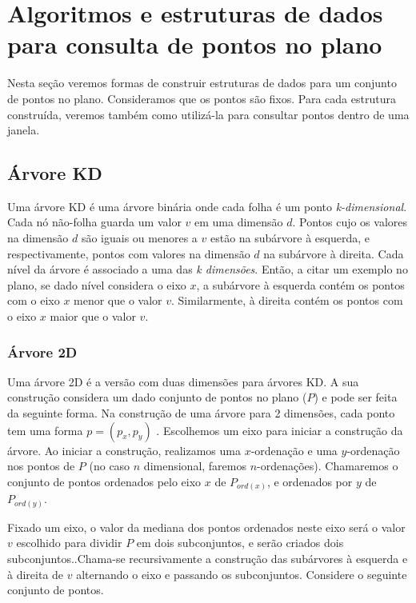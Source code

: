 \chapter{Algoritmos e estruturas de dados para consulta de pontos no plano}\label{cap:desenvolvimento}
Nesta seção veremos formas de construir estruturas de dados para um conjunto de pontos no plano. 
Consideramos que os pontos são fixos. Para cada estrutura construída, veremos também como utilizá-la para
consultar pontos dentro de uma janela.

\section{Árvore KD}

Uma árvore KD é uma árvore binária onde cada folha é um ponto \textit{k-dimensional}.
Cada nó não-folha guarda um valor $v$ em uma dimensão $d$.
Pontos cujo os valores na dimensão $d$ são iguais ou menores a $v$ estão na subárvore à esquerda,
e respectivamente, pontos com valores na dimensão $d$ na subárvore à direita.
Cada nível da árvore é associado a uma das \textit{k dimensões}. Então, a citar um exemplo no plano,
se dado nível considera o eixo $x$, a subárvore à esquerda contém os pontos com o eixo $x$ menor que o valor 
$v$. Similarmente, à direita contém os pontos com o eixo $x$ maior que o valor $v$.

\subsection{Árvore 2D}
Uma árvore 2D é a versão com duas dimensões para árvores KD. A sua construção considera um dado conjunto 
de pontos no plano ($P$) e pode ser feita da seguinte forma. Na construção de uma árvore para 2 dimensões,
cada ponto tem uma forma $p = (p_x, p_y)$ . Escolhemos um eixo para iniciar a construção da árvore.
Ao iniciar a construção, realizamos uma $x$-ordenação e uma $y$-ordenação nos pontos de $P$
(no caso $n$ dimensional, faremos $n$-ordenações). Chamaremos o conjunto de pontos ordenados pelo eixo
$x$ de $P_{ord(x)}$, e ordenados por $y$ de $P_{ord(y)}$.

Fixado um eixo, o valor da mediana dos pontos ordenados neste eixo será o valor $v$ escolhido para dividir
$P$ em dois subconjuntos, e serão criados dois subconjuntos.\cite{cg08}.Chama-se recursivamente a
construção das subárvores à esquerda e à direita de $v$ alternando o eixo e passando os subconjuntos.
Considere o seguinte conjunto de pontos.

